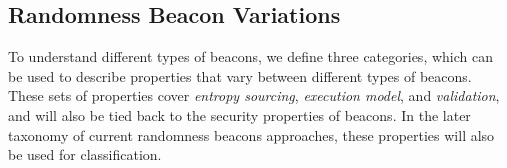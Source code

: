 \subsection{Randomness Beacon Variations}


To understand different types of beacons, we define three categories, which can be used to describe properties that vary between different types of beacons.
These sets of properties cover \emph{entropy sourcing}, \emph{execution model}, and \emph{validation}, and will also be tied back to the security properties of beacons.
In the later taxonomy of current randomness beacons approaches, these properties will also be used for classification.

